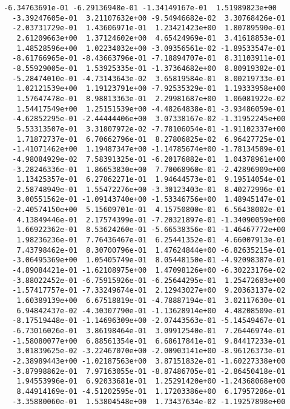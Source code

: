 \documentclass[11pt]{article}
\begin{document}
\begin{Verbatim}[commandchars=\\\{\}]
  -6.34763691e-01 -6.29136948e-01 -1.34149167e-01  1.51989823e+00
  -3.39247605e-01  3.21107632e+00 -9.54946682e-02  3.30768426e-01
  -2.03731729e-01  1.43606971e-01  1.23421423e+00  1.80789590e-01
   2.61209663e+00  1.37124602e+00  4.65424969e-01  3.41618853e-01
   1.48528596e+00  1.02234032e+00 -3.09356561e-02 -1.89533547e-01
  -8.61766965e-01 -8.43663796e-01 -7.18894707e-01  8.31103911e-01
  -8.55929005e-01  1.53925335e-01 -1.37364682e+00  8.80919382e-01
  -5.28474010e-01 -4.73143643e-02  3.65819584e-01  8.00219733e-01
   1.02121539e+00  1.19123791e+00 -7.92535329e-01  1.19333958e+00
   1.57647478e-01  8.98813363e-01  2.29981687e+00  1.06081922e-02
   1.54417549e+00  1.25151539e+00 -4.48264838e-01 -3.93486059e-01
  -4.62852295e-01 -2.44444406e+00  3.07338167e-02 -1.31952245e+00
   5.53313507e-01  3.31807972e-02 -7.78106054e-01 -1.91102337e+00
   1.71872737e-01  6.70662796e-01  8.27806825e-02  6.96427725e-01
  -1.41071462e+00  1.19487347e+00 -1.14785674e+00 -1.78134589e-01
  -4.98084929e-02  7.58391325e-01 -6.20176882e-01  1.04378961e+00
  -3.28246336e-01  1.86653830e+00  7.70068960e-01 -2.42896909e+00
   1.13425357e-01  6.27862271e-01  1.94644573e-01  9.19514054e-01
   2.58748949e-01  1.55472276e+00 -3.30123403e-01  8.40272996e-01
   3.00551562e-01 -1.09143740e+00 -1.53346756e+00  1.48945147e-01
  -2.40574150e+00  5.15609701e-01  4.15750800e-01  6.56438002e-01
   4.13849446e-01  2.17574399e-01 -7.20321897e-01 -1.34090059e+00
   1.66922362e-01  8.53624260e-01 -5.66538356e-01 -1.46467772e+00
   1.98236236e-01  7.76436467e-01  6.25441352e-01  4.66007913e-01
   7.43798462e-01  8.30700796e-01  1.47624844e+00 -6.82635215e-01
  -3.06495369e+00  1.05405749e-01  8.05448150e-01 -4.92098387e-01
  -4.89084421e-01 -1.62108975e+00  1.47098126e+00 -6.30223176e-02
  -3.88022452e-01 -6.75915926e-01 -6.25644295e-01  1.25472683e+00
  -1.57417757e-01 -7.33249674e-01  2.12943027e+00  9.20363137e-02
   1.60389139e+00  6.67518819e-01 -4.78887194e-01  3.02117630e-01
   6.94842437e-02 -4.30307790e-01 -1.13628914e+00  4.48208509e-01
  -8.17519448e-01 -1.14696309e+00 -2.07443563e-01 -5.14549467e-01
  -6.73016026e-01  3.86198464e-01  3.09912540e-01  7.26446974e-01
  -1.58080077e+00  6.88561354e-01  6.68617841e-01  9.84417233e-01
   3.01839625e-02 -3.22467070e+00 -2.00903141e+00 -8.96126373e-01
  -2.38989443e+00 -1.02187563e+00  3.87151832e-01 -1.60227338e+00
  -3.87998862e-01  7.97163055e-01 -8.87486705e-01 -2.86450418e-01
   1.94553996e-01  6.92033681e-01  1.25291420e+00 -1.24368068e+00
   8.44914169e-01 -4.51202595e-01  1.17203386e+00  6.17957286e-01
  -3.35880060e-01  1.53804548e+00  1.73437634e-02 -1.19257898e+00

\end{Verbatim}
\end{document}
